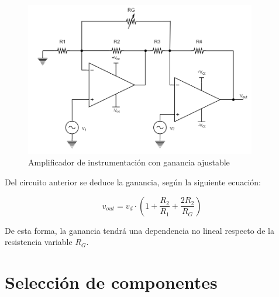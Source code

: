 \begin{figure}[H]
    \centering
    \includegraphics[width=0.9\textwidth]{../EJ4/resources/instrumental_2opamp_adjgain.png}
	\caption{Amplificador de instrumentaci\'on con ganancia ajustable}
   	\label{fig:EJ4_2opamp_adjgain}
\end{figure}

Del circuito anterior se deduce la ganancia, seg\'un la siguiente ecuaci\'on:

\begin{equation}
v_{out} = v_d \cdot \left( 1+\frac{R_2}{R_1}+\frac{2R_2}{R_G} \right)
\end{equation}

De esta forma, la ganancia tendr\'a una dependencia no lineal respecto de la resistencia variable $R_G$.

\section{Selecci\'on de componentes}




